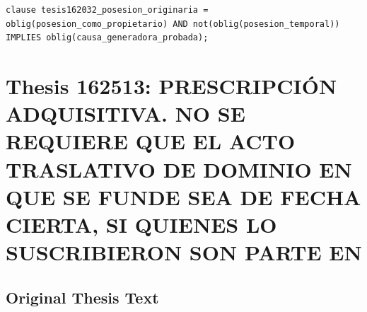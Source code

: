 \documentclass[11pt,a4paper]{article}
\begin{document}
\begin{lstlisting}[style=witnessstyle, language=Witness]
clause tesis162032_posesion_originaria = oblig(posesion_como_propietario) AND not(oblig(posesion_temporal)) IMPLIES oblig(causa_generadora_probada);
\end{lstlisting}

\newpage

\section{Thesis 162513: PRESCRIPCIÓN ADQUISITIVA. NO SE REQUIERE QUE EL ACTO TRASLATIVO DE DOMINIO EN QUE SE FUNDE SEA DE FECHA CIERTA, SI QUIENES LO SUSCRIBIERON SON PARTE EN}
\label{thesis:162513}

\subsection{Original Thesis Text}
\end{document}
